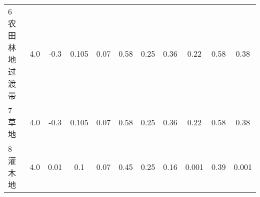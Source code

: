 \begin{sidewaystable}[]
\begin{tabular}{@{}lcccccccccc@{}}
    6 农田林地过渡带      & 4.0        & -0.3                                                                         & 0.105                                                                                                           & 0.07                                                                                                            & 0.58                                                                                                            & 0.25                                                                                                            & 0.36                                                                                                            & 0.22                                                                                                            & 0.58                                                                                                            & 0.38                                                                                                            \\
    7 草地           & 4.0        & -0.3                                                                         & 0.105                                                                                                           & 0.07                                                                                                            & 0.58                                                                                                            & 0.25                                                                                                            & 0.36                                                                                                            & 0.22                                                                                                            & 0.58                                                                                                            & 0.38                                                                                                            \\
    8 灌木地          & 4.0        & 0.01                                                                         & 0.1                                                                                                             & 0.07                                                                                                            & 0.45                                                                                                            & 0.25                                                                                                            & 0.16                                                                                                            & 0.001                                                                                                           & 0.39                                                                                                            & 0.001                                                                                                           \\

\end{tabular}
\end{sidewaystable}
